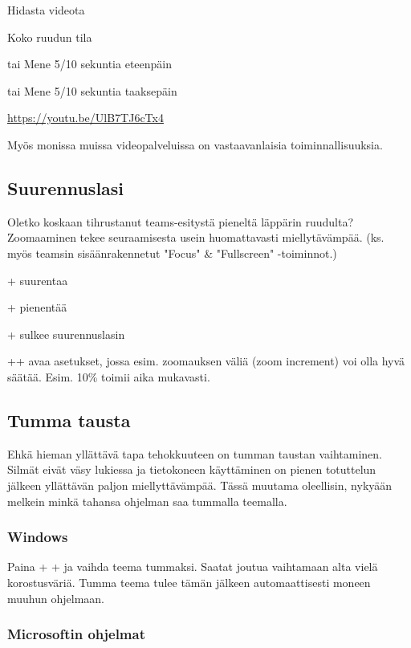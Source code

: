 \documentclass[a4paper,12pt]{scrartcl}
\begin{document}
\keys{\shift + ,} Hidasta videota

 Koko ruudun tila

\keys{\keys{\arrowkeyright}} tai  Mene 5/10 sekuntia eteenpäin

\keys{\keys{\arrowkeyleft}} tai  Mene 5/10 sekuntia taaksepäin

\url{https://youtu.be/UlB7TJ6cTx4}

\medskip

Myös monissa muissa videopalveluissa on vastaavanlaisia toiminnallisuuksia.

\subsection{Suurennuslasi}

Oletko koskaan tihrustanut teams-esitystä pieneltä läppärin ruudulta? Zoomaaminen tekee seuraamisesta usein huomattavasti miellytävämpää. (ks. myös teamsin sisäänrakennetut "Focus" \& "Fullscreen" -toiminnot.)

 + \menu{+} suurentaa

+\keys{-} pienentää

+ sulkee suurennuslasin

+\keys{\shift}+ avaa asetukset, jossa esim. zoomauksen väliä (zoom increment) voi olla hyvä säätää. Esim. 10\% toimii aika mukavasti.

\subsection{Tumma tausta}

Ehkä hieman yllättävä tapa tehokkuuteen on tumman taustan vaihtaminen. Silmät eivät väsy lukiessa ja tietokoneen käyttäminen on pienen totuttelun jälkeen yllättävän paljon miellyttävämpää. Tässä muutama oleellisin, nykyään melkein minkä tahansa ohjelman saa tummalla teemalla.

\subsubsection{Windows}
Paina  +  + \keys{\return} ja vaihda teema tummaksi. Saatat joutua vaihtamaan alta vielä korostusväriä. Tumma teema tulee tämän jälkeen automaattisesti moneen muuhun ohjelmaan.

\subsubsection{Microsoftin ohjelmat}
\end{document}
